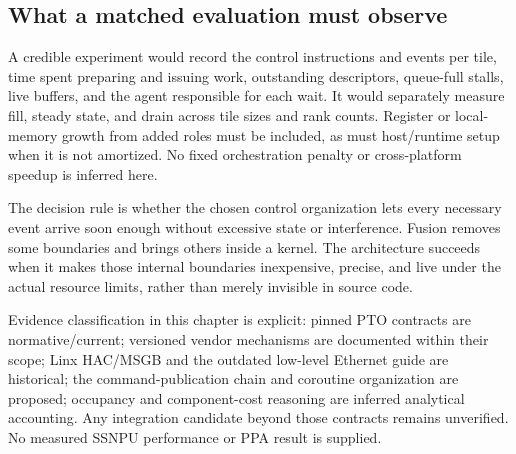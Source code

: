 \subsection{What a matched evaluation must observe}

A credible experiment would record the control instructions and events per tile, time spent preparing and issuing work, outstanding descriptors, queue-full stalls, live buffers, and the agent responsible for each wait. It would separately measure fill, steady state, and drain across tile sizes and rank counts. Register or local-memory growth from added roles must be included, as must host/runtime setup when it is not amortized. No fixed orchestration penalty or cross-platform speedup is inferred here.

The decision rule is whether the chosen control organization lets every necessary event arrive soon enough without excessive state or interference. Fusion removes some boundaries and brings others inside a kernel. The architecture succeeds when it makes those internal boundaries inexpensive, precise, and live under the actual resource limits, rather than merely invisible in source code.

Evidence classification in this chapter is explicit: pinned PTO contracts are normative/current; versioned vendor mechanisms are documented within their scope; Linx HAC/MSGB and the outdated low-level Ethernet guide are historical; the command-publication chain and coroutine organization are proposed; occupancy and component-cost reasoning are inferred analytical accounting. Any integration candidate beyond those contracts remains unverified. No measured SSNPU performance or PPA result is supplied.
